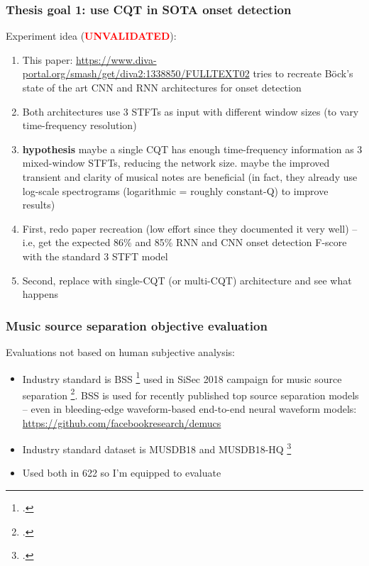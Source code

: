 \documentclass[usenames,dvipsnames]{beamer}
\begin{document}
\begin{frame}
	\frametitle{Thesis goal 1: use CQT in SOTA onset detection}
	Experiment idea (\textcolor{red}{\textbf{UNVALIDATED}}):
	\begin{enumerate}
		\item
			This paper: \href{https://www.diva-portal.org/smash/get/diva2:1338850/FULLTEXT02}{https://www.diva-portal.org/smash/get/diva2:1338850/FULLTEXT02} tries to recreate B{\"o}ck's state of the art CNN and RNN architectures for onset detection
		\item
			Both architectures use 3 STFTs as input with different window sizes (to vary time-frequency resolution)
		\item
			\textbf{hypothesis} maybe a single CQT has enough time-frequency information as 3 mixed-window STFTs, reducing the network size. maybe the improved transient and clarity of musical notes are beneficial (in fact, they already use log-scale spectrograms (logarithmic = roughly constant-Q) to improve results)
		\item
			First, redo paper recreation (low effort since they documented it very well) -- i.e, get the expected 86\% and 85\% RNN and CNN onset detection F-score with the standard 3 STFT model
		\item
			Second, replace with single-CQT (or multi-CQT) architecture and see what happens
	\end{enumerate}
\end{frame}

\begin{frame}
	\frametitle{Music source separation objective evaluation}
	Evaluations not based on human subjective analysis:
	\begin{itemize}
		\item
			Industry standard is BSS \footcite{bss} used in SiSec 2018 campaign for music source separation \footcite{sigsep2018}. BSS is used for recently published top source separation models -- even in bleeding-edge waveform-based end-to-end neural waveform models: \href{https://github.com/facebookresearch/demucs}{https://github.com/facebookresearch/demucs}
		\item
			Industry standard dataset is MUSDB18 and MUSDB18-HQ \footcite{musdb18, musdb18-hq}
		\item
			Used both in 622 so I'm equipped to evaluate
	\end{itemize}
\end{frame}
\end{document}
